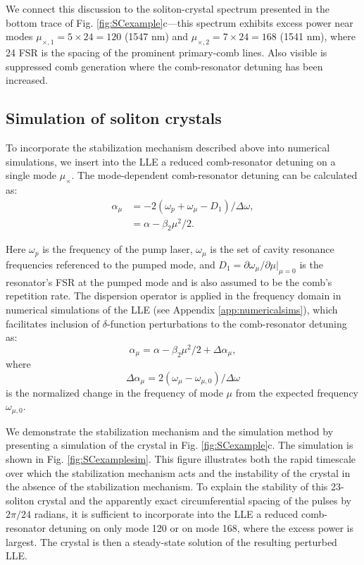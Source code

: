 We connect this discussion to the soliton-crystal spectrum presented in the bottom trace of Fig. \ref{fig:SCexample}c---this spectrum exhibits excess power near modes $\mu_{\times,1}=5\times24=120$ (1547 nm) and $\mu_{\times,2}=7\times24=168$  (1541 nm), where 24 FSR is the spacing of the prominent primary-comb lines. Also visible is suppressed comb generation where the comb-resonator detuning has been increased. 

\subsection{Simulation of soliton crystals}

To incorporate the stabilization mechanism described above into numerical simulations, we insert into the LLE a reduced comb-resonator detuning on a single mode $\mu_\times$. The mode-dependent comb-resonator detuning can be calculated as:
\begin{align}
\alpha_\mu&=-2(\omega_p+\omega_\mu-D_1)/\Delta\omega,\\
&=\alpha-\beta_2\mu^2/2.
\end{align}

Here $\omega_p$ is the frequency of the pump laser, $\omega_\mu$ is the set of cavity resonance frequencies referenced to the pumped mode, and $D_1=\partial\omega_\mu/\partial\mu|_{\mu=0}$ is the resonator's FSR at the pumped mode and is also assumed to be the comb's repetition rate. The dispersion operator is applied in the frequency domain in numerical simulations of the LLE (see Appendix \ref{app:numericalsims}), which facilitates inclusion of $\delta$-function perturbations to the comb-resonator detuning as:
\begin{equation}
\alpha_\mu=\alpha-\beta_2\mu^2/2+\Delta\alpha_\mu,
\end{equation}
where
\begin{equation}
\Delta\alpha_\mu=2(\omega_\mu-\omega_{\mu,0})/\Delta\omega
\end{equation}
is the normalized change in the frequency of mode $\mu$ from the expected frequency $\omega_{\mu,0}$. 

We demonstrate the stabilization mechanism and the simulation method by presenting a simulation of the crystal in Fig. \ref{fig:SCexample}c. The simulation is shown in Fig. \ref{fig:SCexamplesim}. This figure illustrates both the rapid timescale over which the stabilization mechanism acts and the instability of the crystal in the absence of the stabilization mechanism. To explain the stability of this 23-soliton crystal and the apparently exact circumferential spacing of the pulses by $2\pi/24$ radians, it is sufficient to incorporate into the LLE a reduced comb-resonator detuning on only mode 120 or on mode 168, where the excess power is largest. The crystal is then a steady-state solution of the resulting perturbed LLE.

